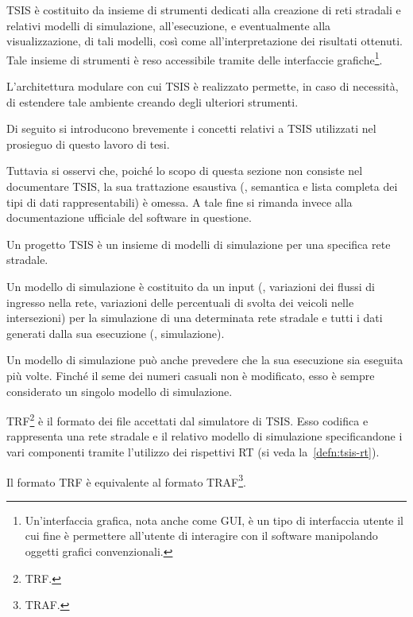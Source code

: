 \acs{TSIS} è costituito da insieme di strumenti dedicati alla creazione di reti stradali e relativi modelli di simulazione, all'esecuzione, e eventualmente alla visualizzazione, di tali modelli, così come all'interpretazione dei risultati ottenuti. Tale insieme di strumenti è reso accessibile tramite delle interfaccie grafiche\footnote{Un'interfaccia grafica, nota anche come \acf{GUI}, è un tipo di interfaccia utente il cui fine è permettere all'utente di interagire con il software manipolando oggetti grafici convenzionali.}.

L'architettura modulare con cui \acs{TSIS} è realizzato permette, in caso di necessità, di estendere tale ambiente creando degli ulteriori strumenti.

Di seguito si introducono brevemente i concetti relativi a \acs{TSIS} utilizzati nel prosieguo di questo lavoro di tesi.

Tuttavia si osservi che, poiché lo scopo di questa sezione non consiste nel documentare \acs{TSIS}, la sua trattazione esaustiva (\eg{}, semantica e lista completa dei tipi di dati rappresentabili) è omessa. A tale fine si rimanda invece alla documentazione ufficiale del software in questione.

\begin{definizione}\label{defn:tsis-proj}
Un progetto \acs{TSIS} è un insieme di modelli di simulazione per una specifica rete stradale.
\end{definizione}

\begin{definizione}\label{defn:tsis-sim-model}
Un modello di simulazione è costituito da un input (\eg{}, variazioni dei flussi di ingresso nella rete, variazioni delle percentuali di svolta dei veicoli nelle intersezioni) per la simulazione di una determinata rete stradale e tutti i dati generati dalla sua esecuzione (\ie{}, simulazione).
\end{definizione}
\begin{osservazione}
Un modello di simulazione può anche prevedere che la sua esecuzione sia eseguita più volte. Finché il seme dei numeri casuali non è modificato, esso è sempre considerato un singolo modello di simulazione.
\end{osservazione}

\begin{definizione}\label{defn:trf-format}
\acs{TRF}\footnote{\acf{TRF}.} è il formato dei file accettati dal simulatore di \acs{TSIS}. Esso codifica e rappresenta una rete stradale e il relativo modello di simulazione specificandone i vari componenti tramite l'utilizzo dei rispettivi \acs{RT} (si veda la~\vref{defn:tsis-rt}).
\end{definizione}
\begin{osservazione}
Il formato \acs{TRF} è equivalente al formato \acs{TRAF}\footnote{\acf{TRAF}.}.
\end{osservazione}

